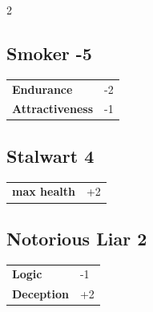 \begin{multicols}{2}
\begin{tcolorbox}

\end{tcolorbox}

\begin{tcolorbox}
    \subsection*{Smoker \hfill \small{-5 }}
    \tcblower




\begin{tabular}{@{}ll@{}}
    \textbf{Endurance} & -2\\
    \textbf{Attractiveness} & -1\\
\end{tabular}


\end{tcolorbox}

\begin{tcolorbox}
    \subsection*{Stalwart \hfill \small{4 }}
    \tcblower




\begin{tabular}{@{}ll@{}}
    \textbf{max health} & +2\\
\end{tabular}


\end{tcolorbox}

\begin{tcolorbox}
    \subsection*{Notorious Liar \hfill \small{2 }}
    \tcblower




\begin{tabular}{@{}ll@{}}
    \textbf{Logic} & -1\\
    \textbf{Deception} & +2\\
\end{tabular}


\end{tcolorbox}
\end{multicols}
